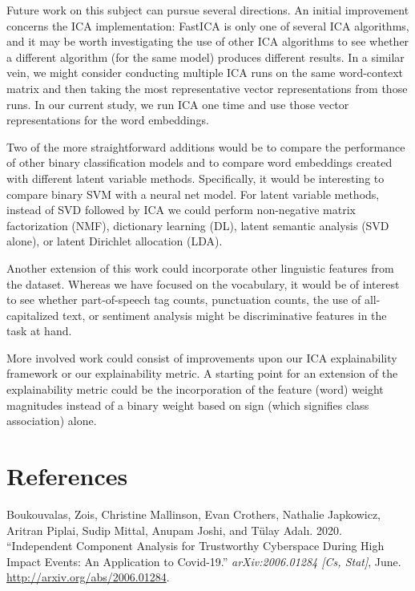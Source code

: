 \documentclass{article}
\begin{document}
Future work on this subject can pursue several directions. An initial
improvement concerns the ICA implementation: FastICA is only one of
several ICA algorithms, and it may be worth investigating the use of
other ICA algorithms to see whether a different algorithm (for the same
model) produces different results. In a similar vein, we might consider
conducting multiple ICA runs on the same word-context matrix and then
taking the most representative vector representations from those runs.
In our current study, we run ICA one time and use those vector
representations for the word embeddings.

Two of the more straightforward additions would be to compare the
performance of other binary classification models and to compare word
embeddings created with different latent variable methods. Specifically,
it would be interesting to compare binary SVM with a neural net model.
For latent variable methods, instead of SVD followed by ICA we could
perform non-negative matrix factorization (NMF), dictionary learning
(DL), latent semantic analysis (SVD alone), or latent Dirichlet
allocation (LDA).

Another extension of this work could incorporate other linguistic
features from the dataset. Whereas we have focused on the vocabulary, it
would be of interest to see whether part-of-speech tag counts,
punctuation counts, the use of all-capitalized text, or sentiment
analysis might be discriminative features in the task at hand.

More involved work could consist of improvements upon our ICA
explainability framework or our explainability metric. A starting point
for an extension of the explainability metric could be the incorporation
of the feature (word) weight magnitudes instead of a binary weight based
on sign (which signifies class association) alone.

\newpage

\hypertarget{references}{%
\section*{References}\label{references}}

\hypertarget{refs}{}
\leavevmode\hypertarget{ref-boukouvalas_independent_2020}{}%
Boukouvalas, Zois, Christine Mallinson, Evan Crothers, Nathalie
Japkowicz, Aritran Piplai, Sudip Mittal, Anupam Joshi, and Tülay Adalı.
2020. ``Independent Component Analysis for Trustworthy Cyberspace During
High Impact Events: An Application to Covid-19.'' \emph{arXiv:2006.01284
{[}Cs, Stat{]}}, June. \url{http://arxiv.org/abs/2006.01284}.
\end{document}
